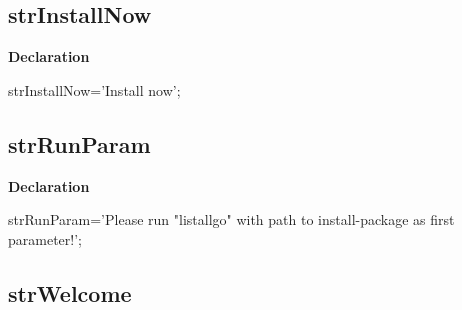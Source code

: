 \documentclass{report}
\newif\ifpdf
\begin{document}
\subsection*{strInstallNow}
\fi
\label{trstrings-strInstallNow}
\begin{list}{}{
\setlength{\itemindent}{0cm}
\setlength{\listparindent}{0cm}
\setlength{\leftmargin}{\evensidemargin}
\addtolength{\leftmargin}{\tmplength}
\settowidth{\labelsep}{X}
\addtolength{\leftmargin}{\labelsep}
\setlength{\labelwidth}{\tmplength}
}
\item[\textbf{Declaration}\hfill]
\ifpdf
\begin{flushleft}
\fi
\begin{ttfamily}
strInstallNow='Install now';\end{ttfamily}

\ifpdf
\end{flushleft}
\fi

\end{list}
\ifpdf
\subsection*{\large{\textbf{strRunParam}}\normalsize\hspace{1ex}\hrulefill}
\else
\subsection*{strRunParam}
\fi
\label{trstrings-strRunParam}
\begin{list}{}{
\setlength{\itemindent}{0cm}
\setlength{\listparindent}{0cm}
\setlength{\leftmargin}{\evensidemargin}
\addtolength{\leftmargin}{\tmplength}
\settowidth{\labelsep}{X}
\addtolength{\leftmargin}{\labelsep}
\setlength{\labelwidth}{\tmplength}
}
\item[\textbf{Declaration}\hfill]
\ifpdf
\begin{flushleft}
\fi
\begin{ttfamily}
strRunParam='Please run "listallgo" with path to install-package as first parameter!';\end{ttfamily}

\ifpdf
\end{flushleft}
\fi

\end{list}
\ifpdf
\subsection*{\large{\textbf{strWelcome}}\normalsize\hspace{1ex}\hrulefill}
\else
\end{document}
